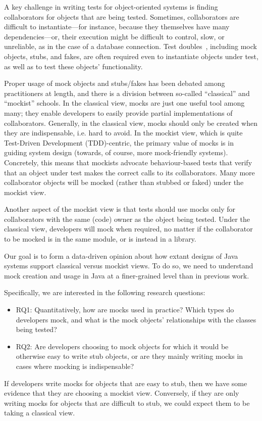 A key challenge in writing tests for object-oriented systems is
finding collaborators for objects that are being tested. Sometimes,
collaborators are difficult to instantiate---for instance, because
they themselves have many dependencies---or, their execution might be
difficult to control, slow, or unreliable, as in the case of a
database connection.  Test doubles~\cite{meszaros2007xunit}, including
mock objects, stubs, and fakes, are often required even to instantiate
objects under test, as well as to test these objects' functionality.

Proper usage of mock objects and stubs/fakes has been debated among
practitioners at length, and there is a division between so-called
``classical'' and ``mockist'' schools. In the classical view, mocks
are just one useful tool among many; they enable developers to easily
provide partial implementations of collaborators. Generally, in the classical
view, mocks should only be created when they are indispensable, i.e. hard to avoid. In the mockist view,
which is quite Test-Driven Development (TDD)-centric, the primary value
of mocks is in guiding system design (towards, of course, more mock-friendly
systems). Concretely, this means that mockists advocate behaviour-based
tests that verify that an object under test makes the correct calls
to its collaborators. Many more collaborator objects will be mocked
(rather than stubbed or faked) under the mockist view.

Another aspect of the mockist view is that tests should use mocks
only for collaborators with the same (code) owner as the object
being tested. Under the classical view, developers will mock
when required, no matter if the collaborator to be mocked is in
the same module, or is instead in a library.

Our goal is to form a data-driven opinion about how extant designs of
Java systems support classical versus mockist views.  To do so, we
need to understand mock creation and usage in Java at a finer-grained level than in
previous work.

Specifically, we are interested in the following research questions:
\begin{itemize}
\item RQ1: Quantitatively, how are mocks used in practice? Which types do developers mock, and what is the
mock objects' relationships with the classes being tested?
\item RQ2: Are developers choosing to mock objects for which it would be otherwise easy to write stub objects, or
are they mainly writing mocks in cases where mocking is indispensable?
\end{itemize}
If developers write mocks for objects that are easy to stub, then we have some evidence that they are choosing
a mockist view. Conversely, if they are only writing mocks for objects that are difficult to stub, we could
expect them to be taking a classical view.

